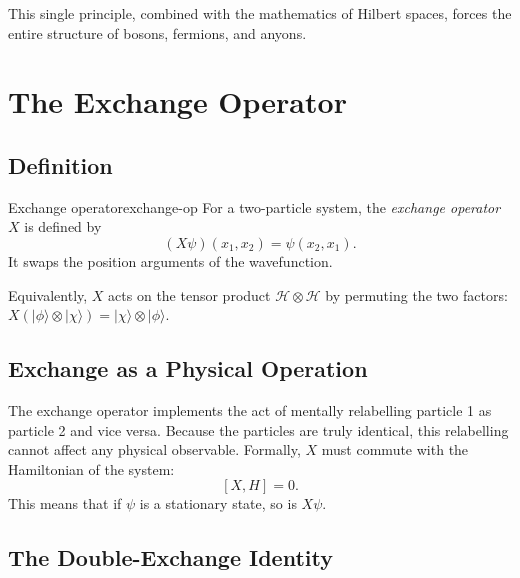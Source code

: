 \documentclass[11pt,a4paper]{article}
\newcommand{\hilb}{\mathcal{H}}
\begin{document}
This single principle, combined with the mathematics of Hilbert spaces, forces
the entire structure of bosons, fermions, and anyons.

\section{The Exchange Operator}
\label{sec:exchange}

\subsection{Definition}

\begin{defn}{Exchange operator}{exchange-op}
  For a two-particle system, the \emph{exchange operator} $X$ is defined by
  \[
    (X\psi)(x_1, x_2) = \psi(x_2, x_1).
  \]
  It swaps the position arguments of the wavefunction.
\end{defn}

Equivalently, $X$ acts on the tensor product $\hilb \otimes \hilb$ by
permuting the two factors: $X(|\phi\rangle \otimes |\chi\rangle) =
|\chi\rangle \otimes |\phi\rangle$.

\subsection{Exchange as a Physical Operation}

The exchange operator implements the act of mentally relabelling particle 1 as
particle 2 and vice versa.  Because the particles are truly identical, this
relabelling cannot affect any physical observable.  Formally, $X$ must commute
with the Hamiltonian of the system:
\[
  [X, H] = 0.
\]
This means that if $\psi$ is a stationary state, so is $X\psi$.

\subsection{The Double-Exchange Identity}
\end{document}
